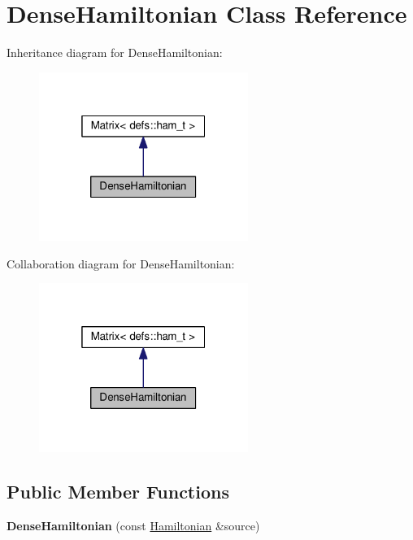 \hypertarget{classDenseHamiltonian}{}\section{Dense\+Hamiltonian Class Reference}
\label{classDenseHamiltonian}


Inheritance diagram for Dense\+Hamiltonian\+:
\nopagebreak
\begin{figure}[H]
\begin{center}
\leavevmode
\includegraphics[width=193pt]{classDenseHamiltonian__inherit__graph}
\end{center}
\end{figure}


Collaboration diagram for Dense\+Hamiltonian\+:
\nopagebreak
\begin{figure}[H]
\begin{center}
\leavevmode
\includegraphics[width=193pt]{classDenseHamiltonian__coll__graph}
\end{center}
\end{figure}
\subsection*{Public Member Functions}
\begin{DoxyCompactItemize}
\item 
{\bfseries Dense\+Hamiltonian} (const \hyperlink{classHamiltonian}{Hamiltonian} \&source)\hypertarget{classDenseHamiltonian_ad171bef2d0b359ea8f93a56b1932272d}{}\label{classDenseHamiltonian_ad171bef2d0b359ea8f93a56b1932272d}

\end{DoxyCompactItemize}
